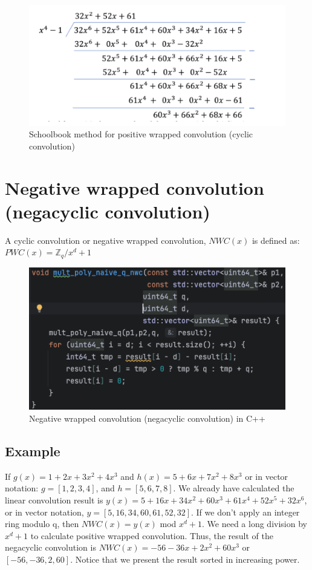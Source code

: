 \documentclass{techrep}
\theoremstyle{definition}
\theoremstyle{plain}
\newcommand{\Z}{\mathbb{Z}}
\begin{document}
\begin{figure}[H]
 	\centering
 	\includegraphics[width=.7\columnwidth]{fig/PWC_1.png}
 	\caption{Schoolbook method for positive wrapped convolution (cyclic convolution)} 
\label{fig:PWC_1}
\end{figure}

\section{Negative wrapped convolution (negacyclic convolution)}
A cyclic convolution or negative wrapped convolution, $NWC(x)$ is defined as: $PWC(x) = \Z_{q}/x^d + 1$  

\begin{figure}[H]
 	\centering
 	\includegraphics[width=.9\columnwidth]{fig/NWC_cplus.png}
 	\caption{Negative wrapped convolution (negacyclic convolution) in C++} 
\label{fig:NWC_cplus}
\end{figure}

\subsection{Example}
If $g(x) = 1 + 2x + 3x^2 + 4x^3$ and $h(x) = 5 + 6x + 7x^2 + 8x^3$ or in vector notation:  $g = [1, 2, 3, 4]$, and $h = [5, 6, 7, 8]$. We already have calculated the linear convolution result is $y(x) = 5 + 16x + 34x^2 + 60x^3 + 61x^4 + 52x^5 + 32x^6$, or in vector notation, $y = [5, 16, 34, 60, 61, 52, 32]$. If we don't apply an integer ring modulo q, then $NWC(x) = y(x)$ mod $x^d + 1$.  We need a long division by $x^d + 1$ to calculate positive wrapped convolution. Thus, the result of the negacyclic convolution is $NWC(x) = -56 -36x + 2x^2 + 60x^3$ or $[-56, -36, 2, 60]$. Notice that we present the result sorted in increasing power.
\end{document}
